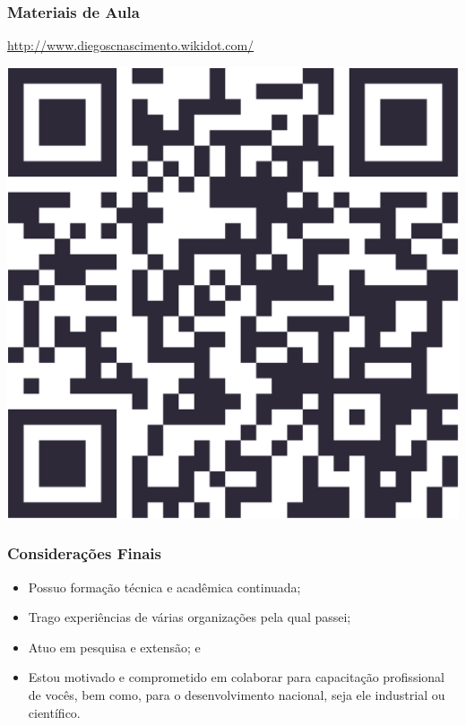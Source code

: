 \documentclass[aspectratio=169]{beamer}
\begin{document}
\begin{frame}
	\frametitle{Materiais de Aula}

\center
	\url{http://www.diegoscnascimento.wikidot.com/} \vfill

	\includegraphics[scale=0.05]{imagens/qrcode}
\end{frame}

\begin{frame}
	\frametitle{Considerações Finais}

	\begin{itemize}
		\item Possuo formação técnica e acadêmica continuada;
		\item Trago experiências de várias organizações pela qual passei;
		\item Atuo em pesquisa e extensão; e
		\item Estou motivado e comprometido em colaborar para capacitação
		profissional de vocês, bem como, para o desenvolvimento nacional, seja ele industrial ou científico.
	\end{itemize}
\end{frame}
\end{document}
